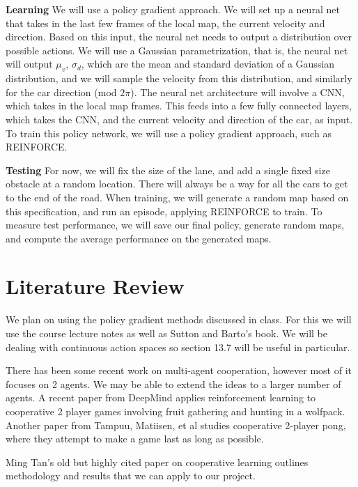 \documentclass{article}
\begin{document}
\textbf{Learning} We will use a policy gradient approach. We will set up a neural net that takes in the last few frames of the local map, the current velocity and direction. Based on this input, the neural net needs to output a distribution over possible actions. We will use a Gaussian parametrization, that is, the neural net will output $\mu_v$, $\sigma_d$, which are the mean and standard deviation of a Gaussian distribution, and we will sample the velocity from this distribution, and similarly for the car direction (mod $2\pi$). The neural net architecture will involve a CNN, which takes in the local map frames. This feeds into a few fully connected layers, which takes the CNN, and the current velocity and direction of the car, as input. To train this policy network, we will use a policy gradient approach, such as REINFORCE.

\textbf{Testing} For now, we will fix the size of the lane, and add a single fixed size obstacle at a random location. There will always be a way for all the cars to get to the end of the road. When training, we will generate a random map based on this specification, and run an episode, applying REINFORCE to train. To measure test performance, we will save our final policy, generate random maps, and compute the average performance on the generated maps.

\section{Literature Review}

We plan on using the policy gradient methods discussed in class. For this
we will use the course lecture notes as well as Sutton and Barto's book\cite{sutton1998reinforcement}.
We will be dealing with continuous action spaces so section 13.7 will be useful in particular.

There has been some recent work on multi-agent cooperation, however most of it focuses on 2 agents. We may be able to extend the ideas to a larger number of agents. A recent paper from DeepMind\cite{leibo2017multi} applies reinforcement learning to cooperative 2 player games involving fruit gathering and hunting in a wolfpack. Another paper from Tampuu, Matiisen, et al\cite{tampuu2015multiagent} studies cooperative 2-player pong, where they attempt to make a game last as long as possible.

Ming Tan's old but highly cited paper\cite{tan1993multi} on cooperative learning outlines methodology and results that we can apply to our project.
\end{document}
